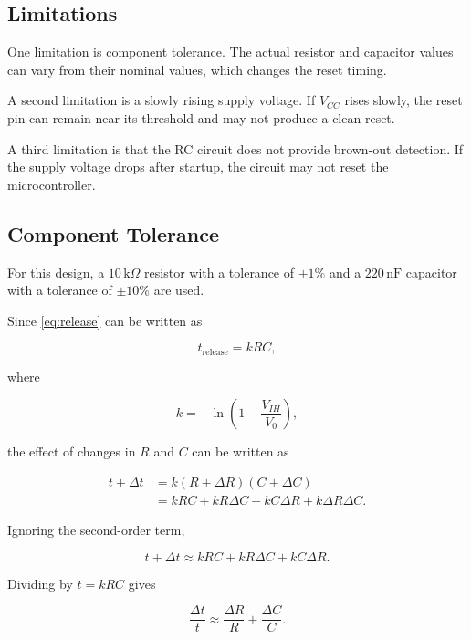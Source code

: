 \documentclass[conference]{IEEEtran}
\begin{document}
\subsection{Limitations}

One limitation is component tolerance. The actual resistor and
capacitor values can vary from their nominal values, which changes the
reset timing.

A second limitation is a slowly rising supply voltage. If $V_{CC}$
rises slowly, the reset pin can remain near its threshold and may not
produce a clean reset.

A third limitation is that the RC circuit does not provide brown-out
detection. If the supply voltage drops after startup, the circuit may
not reset the microcontroller.


\subsection{Component Tolerance}

For this design, a $10\,\text{k}\Omega$ resistor with a tolerance of
$\pm1\%$ and a $220\,\text{nF}$ capacitor with a tolerance of
$\pm10\%$ are used.

Since \eqref{eq:release} can be written as

\begin{equation}
t_{\mathrm{release}}=kRC,
\end{equation}

where

\begin{equation}
k=-\ln\left(1-\frac{V_{IH}}{V_0}\right),
\end{equation}

the effect of changes in $R$ and $C$ can be written as

\begin{align}
t+\Delta t
&=k(R+\Delta R)(C+\Delta C) \\
&=kRC+kR\Delta C+kC\Delta R+k\Delta R\Delta C.
\end{align}

Ignoring the second-order term,

\begin{equation}
t+\Delta t
\approx
kRC+kR\Delta C+kC\Delta R.
\end{equation}

Dividing by $t=kRC$ gives

\begin{equation}
\frac{\Delta t}{t}
\approx
\frac{\Delta R}{R}
+
\frac{\Delta C}{C}.
\label{eq:tolerance}
\end{equation}
\end{document}
